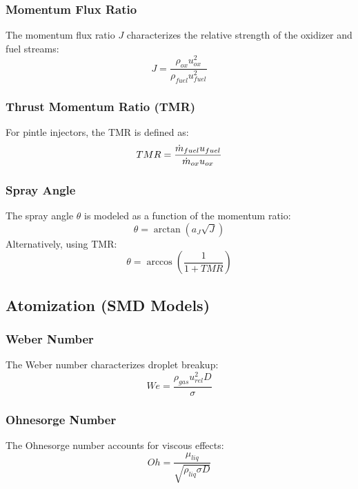\subsubsection{Momentum Flux Ratio}
The momentum flux ratio $J$ characterizes the relative strength of the oxidizer and fuel streams:
\begin{equation}
J = \frac{\rho_{ox} u_{ox}^2}{\rho_{fuel} u_{fuel}^2}
\end{equation}

\subsubsection{Thrust Momentum Ratio (TMR)}
For pintle injectors, the TMR is defined as:
\begin{equation}
TMR = \frac{\dot{m}_{fuel} u_{fuel}}{\dot{m}_{ox} u_{ox}}
\end{equation}

\subsubsection{Spray Angle}
The spray angle $\theta$ is modeled as a function of the momentum ratio:
\begin{equation}
\theta = \arctan(a_J \sqrt{J})
\end{equation}
Alternatively, using TMR:
\begin{equation}
\theta = \arccos\left(\frac{1}{1 + TMR}\right)
\end{equation}

\subsection{Atomization (SMD Models)}

\subsubsection{Weber Number}
The Weber number characterizes droplet breakup:
\begin{equation}
We = \frac{\rho_{gas} u_{rel}^2 D}{\sigma}
\end{equation}

\subsubsection{Ohnesorge Number}
The Ohnesorge number accounts for viscous effects:
\begin{equation}
Oh = \frac{\mu_{liq}}{\sqrt{\rho_{liq} \sigma D}}
\end{equation}

